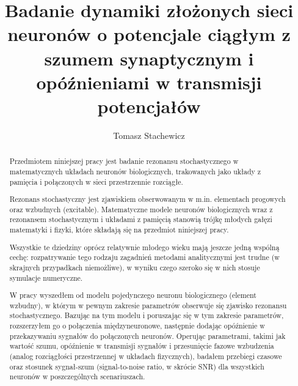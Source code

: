 \documentclass[12pt]{article}
\title{Badanie dynamiki złożonych sieci neuronów o potencjale ciągłym
  z szumem synaptycznym i opóźnieniami w transmisji potencjałów}
\author{Tomasz Stachewicz}
\begin{document}
  \thispagestyle{empty}               %
  \stronatytulowa                     %

  \begin{abstract}
  Przedmiotem niniejszej pracy jest badanie rezonansu stochastycznego w matematycznych układach neuronów biologicznych, trakowanych jako układy z pamięcia i połączonych w sieci przestrzennie rozciągłe.

  Rezonans stochastyczny jest zjawiskiem obserwowanym w m.in. elementach progowych oraz wzbudnych (excitable). Matematyczne modele neuronów biologicznych wraz z rezonansem stochastycznym i układami z pamięcią stanowią trójkę młodych gałęzi matematyki i fizyki, które składają się na przedmiot niniejszej pracy.
  
  Wszystkie te dziedziny oprócz relatywnie młodego wieku mają jeszcze jedną wspólną cechę: rozpatrywanie tego rodzaju zagadnień metodami analitycznymi jest trudne (w skrajnych przypadkach niemożliwe), w wyniku czego szeroko się w nich stosuje symulacje numeryczne.
  
  W pracy wyszedłem od modelu pojedynczego neuronu biologicznego (element wzbudny), w którym w pewnym zakresie parametrów obserwuje się zjawisko rezonansu stochastycznego. Bazując na tym modelu i poruszając się w tym zakresie parametrów, rozszerzyłem go o połączenia międzyneuronowe, następnie dodając opóźnienie w przekazywaniu sygnałów do połączonych neuronów. Operując parametrami, takimi jak wartość szumu, opóźnienie w transmisji sygnałów i przesunięcie fazowe wzbudzenia (analog rozciągłości przestrzennej w układach fizycznych), badałem przebiegi czasowe oraz stosunek sygnał-szum (signal-to-noise ratio, w skrócie SNR) dla wszystkich neuronów w poszczególnych scenariuszach. 

  \end{abstract}

  \newpage

  \tableofcontents
  \newpage

  
  \newpage

  
  \newpage

  
  \newpage
    
  
  
  
  
  
\end{document}
